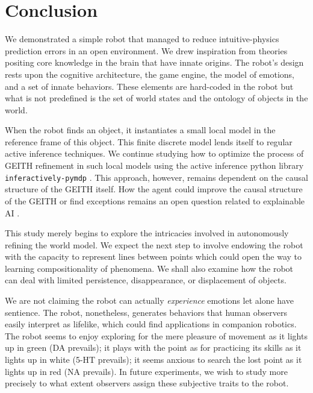 \documentclass[runningheads]{llncs}
\begin{document}

\section{Conclusion}

We demonstrated a simple robot that managed to reduce intuitive-physics prediction errors in an open environment. 
We drew inspiration from theories positing core knowledge in the brain that have innate origins.
The robot's design rests upon the cognitive architecture, the game engine, the model of emotions, and a set of innate behaviors.
These elements are hard-coded in the robot but what is not predefined is the set of world states and the ontology of objects in the world.

When the robot finds an object, it instantiates a small local model in the reference frame of this object. 
This finite discrete model lends itself to regular active inference techniques. 
We continue studying how to optimize the process of GEITH refinement in such local models using the active inference python library  \texttt{inferac\-tively-pymdp} \cite{Heins2022}.
This approach, however, remains dependent on the causal structure of the GEITH itself.
How the agent could improve the causal structure of the GEITH or find exceptions remains an open question related to explainable AI \cite{thorisson_explanation_2021}.

This study merely begins to explore the intricacies involved in autonomously refining the world model.
We expect the next step to involve endowing the robot with the capacity to represent lines between points which could open the way to learning compositionality of phenomena. 
We shall also examine how the robot can deal with limited persistence, disappearance, or displacement of objects. 

We are not claiming the robot can actually \textit{experience} emotions let alone have sentience. 
The robot, nonetheless, generates behaviors that human observers easily interpret as lifelike, which could find applications in companion robotics.
The robot seems to enjoy exploring for the mere pleasure of movement as it lights up in green (DA prevails); 
it plays with the point as for practicing its skills as it lights up in white (5-HT prevails); 
it seems anxious to search the lost point as it lights up in red (NA prevails). 
In future experiments, we wish to study more precisely to what extent observers assign these subjective traits to the robot.
\end{document}
